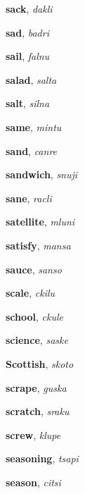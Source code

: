 \documentclass[12pt]{book}
\begin{document}
\begin{description}

\item[ ] \textbf{sack}, \textit{dakli}

\item[ ] \textbf{sad}, \textit{badri}

\item[ ] \textbf{sail}, \textit{falnu}

\item[ ] \textbf{salad}, \textit{salta}

\item[ ] \textbf{salt}, \textit{silna}

\item[ ] \textbf{same}, \textit{mintu}

\item[ ] \textbf{sand}, \textit{canre}

\item[ ] \textbf{sandwich}, \textit{snuji}

\item[ ] \textbf{sane}, \textit{racli}

\item[ ] \textbf{satellite}, \textit{mluni}

\item[ ] \textbf{satisfy}, \textit{mansa}

\item[ ] \textbf{sauce}, \textit{sanso}

\item[ ] \textbf{scale}, \textit{ckilu}

\item[ ] \textbf{school}, \textit{ckule}

\item[ ] \textbf{science}, \textit{saske}

\item[ ] \textbf{Scottish}, \textit{skoto}

\item[ ] \textbf{scrape}, \textit{guska}

\item[ ] \textbf{scratch}, \textit{sraku}

\item[ ] \textbf{screw}, \textit{klupe}

\item[ ] \textbf{seasoning}, \textit{tsapi}

\item[ ] \textbf{season}, \textit{citsi}


\end{description}
\end{document}
